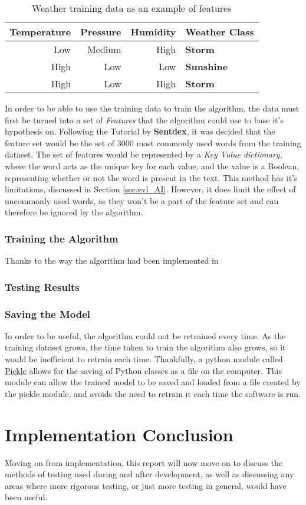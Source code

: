 \begin{table}[ht!]
\centering
\begin{tabular}{r | r | r || l}
\textbf{Temperature} & \textbf{Pressure} & \textbf{Humidity} & \textbf{Weather Class} \\
\hline
Low  & Medium  & High & \textbf{Storm}    \\
High & Low     & Low  & \textbf{Sunshine} \\
High & Low     & High & \textbf{Storm}

\end{tabular}
\caption{Weather training data as an example of features}
\label{tbl:weather_feature}
\end{table}

In order to be able to use the training data to train the algorithm, the data must first be turned into a set of \emph{Features} that the algorithm could use to base it's hypothesis on. Following the Tutorial by \textbf{Sentdex}\cite{NLTKYoutubePlaylist}, it was decided that the feature set would be the set of 3000 most commonly used words from the training dataset. The set of features would be represented by a \emph{Key Value dictionary}, where the word acts as the unique key for each value, and the value is a Boolean, representing whether or not the word is present in the text. This method has it's limitations, discussed in Section \ref{sec:evl_AI}. However, it does limit the effect of uncommonly used words, as they won't be a part of the feature set and can therefore be ignored by the algorithm.

\subsubsection{Training the Algorithm}
Thanks to the way the algorithm had been implemented in 
\subsubsection{Testing Results}
\subsubsection{Saving the Model}

In order to be useful, the algorithm could not be retrained every time. As the training dataset grows, the time taken to train the algorithm also grows, so it would be inefficient to retrain each time. Thankfully, a python module called \href{https://docs.python.org/3/library/pickle.html}{Pickle} allows for the saving of Python classes as a file on the computer. This module can allow the trained model to be saved and loaded from a file created by the pickle module, and avoids the need to retrain it each time the software is run.

\section{Implementation Conclusion}

Moving on from implementation, this report will now move on to discuss the methods of testing used during and after development, as well as discussing any areas where more rigorous testing, or just more testing in general, would have been useful.